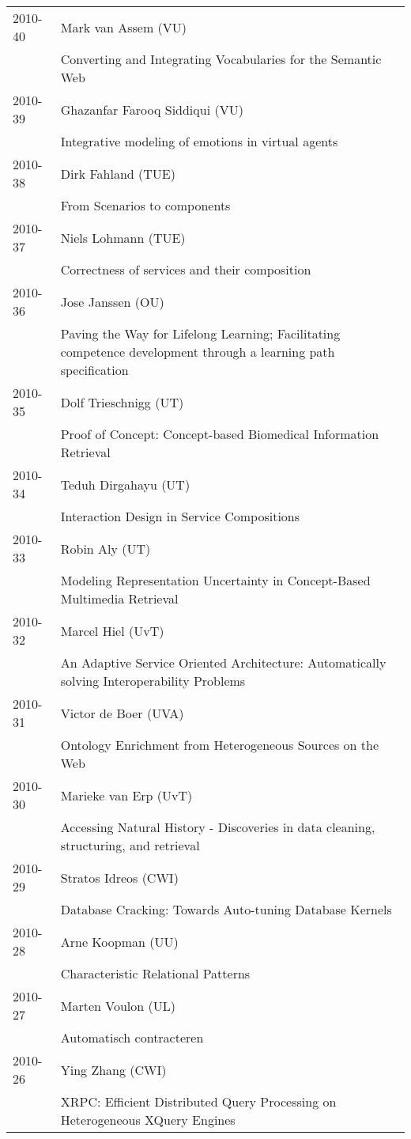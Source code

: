 \begin{longtable}{p{1.25cm}p{10.75cm}}
2010-40 & Mark van Assem (VU) \\& Converting and Integrating Vocabularies for the Semantic Web \\
2010-39 & Ghazanfar Farooq Siddiqui (VU) \\& Integrative modeling of emotions in virtual agents \\
2010-38 & Dirk Fahland (TUE) \\& From Scenarios to components \\
2010-37 & Niels Lohmann (TUE) \\& Correctness of services and their composition \\
2010-36 & Jose Janssen (OU) \\& Paving the Way for Lifelong Learning; Facilitating competence development through a learning path specification \\
2010-35 & Dolf Trieschnigg (UT) \\& Proof of Concept: Concept-based Biomedical Information Retrieval \\
2010-34 & Teduh Dirgahayu (UT) \\& Interaction Design in Service Compositions \\
2010-33 & Robin Aly (UT) \\& Modeling Representation Uncertainty in Concept-Based Multimedia \newline Retrieval \\
2010-32 & Marcel Hiel (UvT) \\& An Adaptive Service Oriented Architecture: Automatically solving \newline Interoperability Problems \\
2010-31 & Victor de Boer (UVA) \\& Ontology Enrichment from Heterogeneous Sources on the Web \\
2010-30 & Marieke van Erp (UvT) \\& Accessing Natural History - Discoveries in data cleaning, structuring, and retrieval \\
2010-29 & Stratos Idreos (CWI) \\& Database Cracking: Towards Auto-tuning Database Kernels \\
2010-28 & Arne Koopman (UU) \\& Characteristic Relational Patterns \\
2010-27 & Marten Voulon (UL) \\& Automatisch contracteren \\
2010-26 & Ying Zhang (CWI) \\& XRPC: Efficient Distributed Query Processing on Heterogeneous XQuery Engines \\

\end{longtable}
